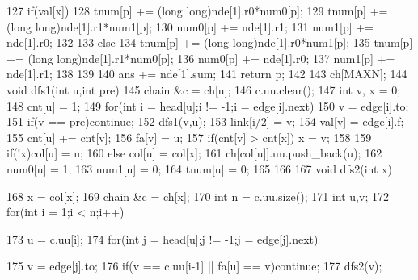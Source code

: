 \documentclass[11pt]{article}
\begin{document}
\begin{Code}
{{{127                  if(val[x]){
128                      tnum[p] += (long long)nde[1].r0*num0[p];
129                      tnum[p] += (long long)nde[1].r1*num1[p];
130                      num0[p] += nde[1].r1;
131                      num1[p] += nde[1].r0;
132                  }
133                  else {
134                      tnum[p] += (long long)nde[1].r0*num1[p];
135                      tnum[p] += (long long)nde[1].r1*num0[p];
136                      num0[p] += nde[1].r0;
137                      num1[p] += nde[1].r1;
138                  }
139              }
140              ans += nde[1].sum;
141              return p;
142       }
143   }ch[MAXN];
144   void dfs1(int u,int pre){
145       chain &c = ch[u];
146       c.uu.clear();
147       int v, x = 0;
148       cnt[u] = 1;
149       for(int i = head[u];i != -1;i = edge[i].next){
150           v = edge[i].to;
151           if(v == pre)continue;
152           dfs1(v,u);
153           link[i/2] = v;
154           val[v] = edge[i].f;
155           cnt[u] += cnt[v];
156           fa[v] = u;
157           if(cnt[v] > cnt[x]) x = v;
158       }
159       if(!x)col[u] = u;
160       else col[u] = col[x];
161       ch[col[u]].uu.push_back(u);
162       num0[u] = 1;
163       num1[u] = 0;
164       tnum[u] = 0;
165
166   }
167   void dfs2(int x){
168       x = col[x];
169       chain &c = ch[x];
170       int n = c.uu.size();
171       int u,v;
172       for(int i = 1;i < n;i++){
173           u = c.uu[i];
174           for(int j = head[u];j != -1;j = edge[j].next){
175                v = edge[j].to;
176                if(v == c.uu[i-1] || fa[u] == v)continue;
177                dfs2(v);


}}}
\end{Code}
\end{document}
